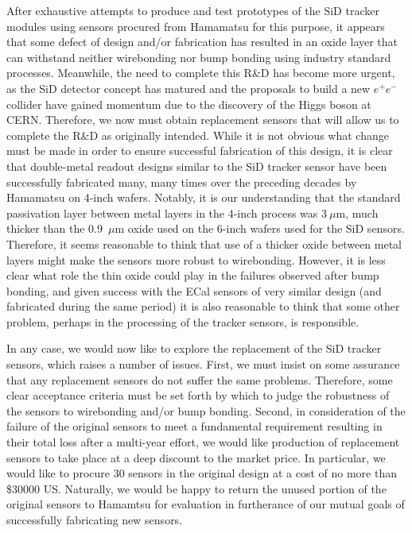 \documentclass[prc,12pt,nofootinbib,letterpaper]{revtex4}
\begin{document}
After exhaustive attempts to produce and test prototypes of the SiD tracker modules using  sensors procured from Hamamatsu for this purpose, it appears that some defect of design and/or fabrication has resulted in an oxide layer that can withstand neither wirebonding nor bump bonding using industry standard processes.  Meanwhile, the need to complete this R\&D has become more urgent, as the SiD detector concept has matured and the proposals to build a new $e^+e^-$ collider have gained momentum due to the discovery of the Higgs boson at CERN.  Therefore, we now must obtain replacement sensors that will allow us to complete the R\&D as originally intended.  While it is not obvious what change must be made in order to ensure successful fabrication of this design, it is clear that double-metal readout designs similar to the SiD tracker sensor have been successfully fabricated many, many times over the preceding decades by Hamamatsu on 4-inch wafers. Notably, it is our understanding that the standard passivation layer between metal layers in the 4-inch process was 3$~\mu$m, much thicker than the 0.9~$\mu$m oxide used on the 6-inch wafers used for the SiD sensors.    Therefore, it seems reasonable to think that use of a thicker oxide between metal layers might make the sensors more robust to wirebonding.  However, it is less clear what role the thin oxide could play in the failures observed after bump bonding, and given success with the ECal sensors of very similar design (and fabricated during the same period) it is also reasonable to think that some other problem, perhaps in the processing of the tracker sensors, is responsible.

In any case, we would now like to explore the replacement of the SiD tracker sensors, which raises a number of issues.  First, we must insist on some assurance that any replacement sensors do not suffer the same problems. Therefore, some clear acceptance criteria must be set forth by which to judge the robustness of the sensors to wirebonding and/or bump bonding.  Second, in consideration of the failure of the original sensors to meet a fundamental requirement resulting in their total loss after a multi-year effort, we would like production of replacement sensors to take place at a deep discount to the market price.  In particular, we would like to procure 30 sensors in the original design at a cost of no more than \$30000 US.  Naturally, we would be happy to return the unused portion of the original sensors to Hamamtsu for evaluation in furtherance of our mutual goals of successfully fabricating new sensors.
\end{document}
